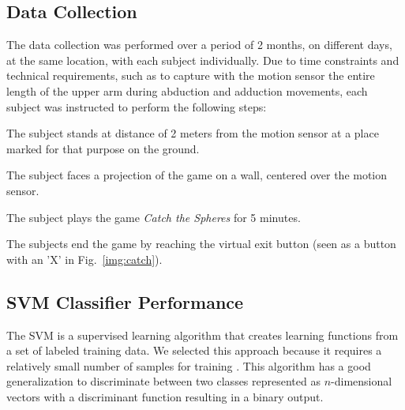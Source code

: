 \documentclass[10pt, conference, compsocconf]{IEEEtran}
\begin{document}
\subsection{Data Collection}

The data collection was performed over a period of 2 months, on different days, at the same location, with each subject individually. Due to time constraints and technical requirements, such as to capture with the motion sensor the entire length of the upper arm during abduction and adduction movements, each subject was instructed to perform the following steps:

\begin{compactenum}
	\item The subject stands at distance of 2 meters from the motion sensor at a place marked for that purpose on the ground.
	\item The subject faces a projection of the game on a wall, centered over the motion sensor.
	\item The subject plays the game \textit{Catch the Spheres} for 5 minutes.
	\item The subjects end the game by reaching the virtual exit button (seen as a button with an 'X' in Fig.~\ref{img:catch}).
\end{compactenum} 

\subsection{SVM Classifier Performance}
\label{classifier_performance}

The SVM is a supervised learning algorithm that creates learning functions from a set of labeled training data. We selected this approach because it requires a relatively small number of samples for training \cite{kantardzic2011data}. This algorithm has a good generalization to discriminate between two classes represented as $n$-dimensional vectors with a discriminant function resulting in a binary output.


\end{document}
